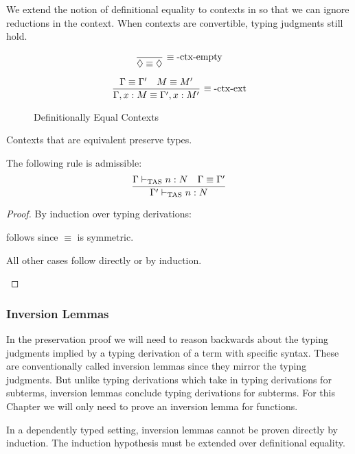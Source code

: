 We extend the notion of definitional equality to contexts in  so that we can ignore reductions in the context.
When contexts are convertible, typing judgments still hold.
 
\begin{figure}
\[
\frac{\ }{\lozenge\equiv\lozenge}\,\rulename{\equiv-ctx-empty}
\]
 
\[
\frac{\Gamma\equiv\Gamma'\quad M\equiv M'}{\Gamma,x:M\equiv\Gamma',x:M'}\,\operatorname{\equiv-ctx-ext}
\]
 
\caption{Definitionally Equal Contexts}
\label{fig:surface-Context-Equiv}
\end{figure}
 
\begin{lem}
Contexts that are equivalent preserve types.
 
The following rule is admissible:
\[
\frac{\Gamma\vdash_{\mathrm{TAS}} n:N\quad\Gamma\equiv\Gamma'}{\Gamma'\vdash_{\mathrm{TAS}} n:N}
\]
\end{lem}
\begin{proof}
By induction over typing derivations:
\begin{casenv}
 \item {} follows since $\equiv$ is symmetric.
 \item All other cases follow directly or by induction.
\end{casenv}
\end{proof}
 
\subsubsection{Inversion Lemmas}
In the preservation proof we will need to reason backwards about the typing judgments implied by a typing derivation of a term with specific syntax.
These are conventionally called inversion lemmas since they mirror the typing judgments.
But unlike typing derivations which take in typing derivations for subterms, inversion lemmas conclude typing derivations for subterms.
For this Chapter we will only need to prove an inversion lemma for functions.
 
In a dependently typed setting, inversion lemmas cannot be proven directly by induction.
The induction hypothesis must be extended over definitional equality.
 
